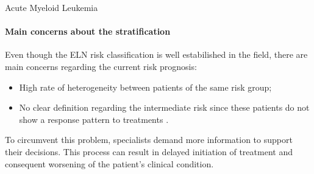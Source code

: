 \begin{frame}[fragile]{Acute Myeloid Leukemia}
\framesubtitle{Main concerns about the stratification}

Even though the ELN risk classification is well estabilished in the field, there are main concerns regarding the current risk prognosis:

\vspace{0.25cm}

\begin{itemize}
\item High rate of heterogeneity between patients of the same risk group;

\item No clear definition regarding the intermediate risk since these patients do not show a response pattern to treatments \cite{Dohner-2010}.

\end{itemize}

\vspace{0.25cm}

 To circumvent this problem,  specialists demand more information to support their decisions.
 This process can result in delayed initiation of treatment and consequent worsening of the patient's clinical condition.
 

\end{frame}













